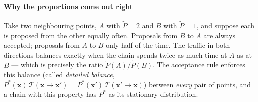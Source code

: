 \documentclass[11pt, oneside]{book}
\newcommand{\bx}{\mathbf{x}}  \newcommand{\by}{\mathbf{y}}
\begin{document}
\paragraph{Why the proportions come out right} Take two neighbouring points,
$A$ with $\tilde P = 2$ and $B$ with $\tilde P = 1$, and suppose each is
proposed from the other equally often. Proposals from $B$ to $A$ are always
accepted; proposals from $A$ to $B$ only half of the time. The traffic in both
directions balances exactly when the chain spends twice as much time at $A$
as at $B$ --- which is precisely the ratio $\tilde P(A)/\tilde P(B)$. The
acceptance rule enforces this balance (called \emph{detailed balance},
$P^*(\bx)\,\mathcal{T}(\bx \to \bx') = P^*(\bx')\,\mathcal{T}(\bx' \to \bx)$)
between \emph{every} pair of points, and a chain with this property has $P^*$
as its stationary distribution.
\end{document}
